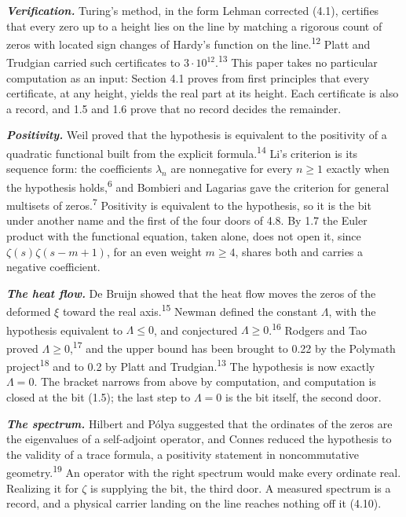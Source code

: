 \documentclass[10pt]{article}
\begin{document}
\textbf{\emph{Verification.}} Turing's method, in the form Lehman
corrected (4.1), certifies that every zero up to a height lies on the
line by matching a rigorous count of zeros with located sign changes of
Hardy's function on the line.\textsuperscript{12} Platt and Trudgian
carried such certificates to \(3\cdot 10^{12}\).\textsuperscript{13}
This paper takes no particular computation as an input: Section 4.1
proves from first principles that every certificate, at any height,
yields the real part at its height. Each certificate is also a record,
and 1.5 and 1.6 prove that no record decides the remainder.

\textbf{\emph{Positivity.}} Weil proved that the hypothesis is
equivalent to the positivity of a quadratic functional built from the
explicit formula.\textsuperscript{14} Li's criterion is its sequence
form: the coefficients \(\lambda_n\) are nonnegative for every
\(n \ge 1\) exactly when the hypothesis holds,\textsuperscript{6} and
Bombieri and Lagarias gave the criterion for general multisets of
zeros.\textsuperscript{7} Positivity is equivalent to the hypothesis, so
it is the bit under another name and the first of the four doors of 4.8.
By 1.7 the Euler product with the functional equation, taken alone, does
not open it, since \(\zeta(s)\zeta(s-m+1)\), for an even weight
\(m \ge 4\), shares both and carries a negative coefficient.

\textbf{\emph{The heat flow.}} De Bruijn showed that the heat flow moves
the zeros of the deformed \(\xi\) toward the real
axis.\textsuperscript{15} Newman defined the constant \(\Lambda\), with
the hypothesis equivalent to \(\Lambda \le 0\), and conjectured
\(\Lambda \ge 0\).\textsuperscript{16} Rodgers and Tao proved
\(\Lambda \ge 0\),\textsuperscript{17} and the upper bound has been
brought to 0.22 by the Polymath project\textsuperscript{18} and to 0.2
by Platt and Trudgian.\textsuperscript{13} The hypothesis is now exactly
\(\Lambda = 0\). The bracket narrows from above by computation, and
computation is closed at the bit (1.5); the last step to \(\Lambda = 0\)
is the bit itself, the second door.

\textbf{\emph{The spectrum.}} Hilbert and Pólya suggested that the
ordinates of the zeros are the eigenvalues of a self-adjoint operator,
and Connes reduced the hypothesis to the validity of a trace formula, a
positivity statement in noncommutative geometry.\textsuperscript{19} An
operator with the right spectrum would make every ordinate real.
Realizing it for \(\zeta\) is supplying the bit, the third door. A
measured spectrum is a record, and a physical carrier landing on the
line reaches nothing off it (4.10).
\end{document}
